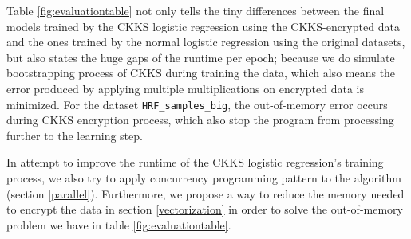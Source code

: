     Table \ref{fig:evaluationtable} not only tells the tiny differences between the final models trained by the CKKS logistic regression using the CKKS-encrypted data and the ones trained by the normal logistic regression using the original datasets, but also states the huge gaps of the runtime per epoch; because we do simulate bootstrapping process of CKKS during training the data, which also means the error produced by applying multiple multiplications on encrypted data is minimized. For the dataset \texttt{HRF\_samples\_big}, the out-of-memory error occurs during CKKS encryption process, which also stop the program from processing further to the learning step.
    
    \begin{table}
    \caption{CKKS LR implementation results for 4 datasets}
    \label{fig:evaluationtable}
    \end{table}
    
    In attempt to improve the runtime of the CKKS logistic regression's training process, we also try to apply concurrency programming pattern to the algorithm (section \ref{parallel}). Furthermore, we propose a way to reduce the memory needed to encrypt the data in section \ref{vectorization} in order to solve the out-of-memory problem we have in table \ref{fig:evaluationtable}.